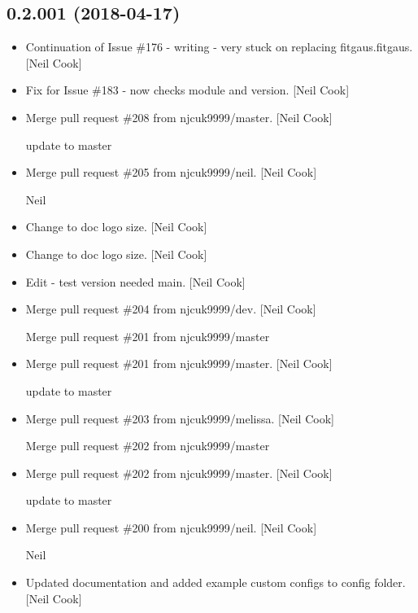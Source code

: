 \documentclass[a4paper,10pt,english]{report}
\begin{document}
\subsection{0.2.001 (2018-04-17)}
\label{\detokenize{misc/changelog:id459}}\begin{itemize}
\item {} 
Continuation of Issue \#176 - writing  - very stuck on replacing
fitgaus.fitgaus. {[}Neil Cook{]}

\item {} 
Fix for Issue \#183 - now checks module and version. {[}Neil Cook{]}

\item {} 
Merge pull request \#208 from njcuk9999/master. {[}Neil Cook{]}

update to master

\item {} 
Merge pull request \#205 from njcuk9999/neil. {[}Neil Cook{]}

Neil

\item {} 
Change to doc logo size. {[}Neil Cook{]}

\item {} 
Change to doc logo size. {[}Neil Cook{]}

\item {} 
Edit - test version needed main. {[}Neil Cook{]}

\item {} 
Merge pull request \#204 from njcuk9999/dev. {[}Neil Cook{]}

Merge pull request \#201 from njcuk9999/master

\item {} 
Merge pull request \#201 from njcuk9999/master. {[}Neil Cook{]}

update to master

\item {} 
Merge pull request \#203 from njcuk9999/melissa. {[}Neil Cook{]}

Merge pull request \#202 from njcuk9999/master

\item {} 
Merge pull request \#202 from njcuk9999/master. {[}Neil Cook{]}

update to master

\item {} 
Merge pull request \#200 from njcuk9999/neil. {[}Neil Cook{]}

Neil

\item {} 
Updated documentation and added example custom configs to config
folder. {[}Neil Cook{]}


\end{itemize}
\end{document}
